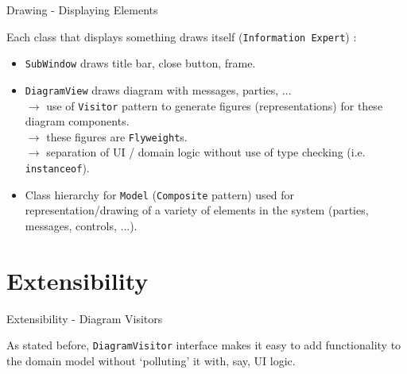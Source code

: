 \documentclass[10pt]{beamer}
\begin{document}
\begin{frame}[fragile]{Drawing - Displaying Elements}
	\begin{center}
	Each class that displays something draws itself (\texttt{Information Expert}) :
	\begin{itemize}
	\item \texttt{SubWindow} draws title bar, close button, frame.
	\item \texttt{DiagramView} draws diagram with messages, parties, ...
	\\$\rightarrow$ use of \texttt{Visitor} pattern to generate figures (representations) for these diagram components.
	\\$\rightarrow$ these figures are \texttt{Flyweight}s.
	\\$\rightarrow$ separation of UI / domain logic without use of type checking (i.e. \texttt{instanceof}).
	\item Class hierarchy for \texttt{Model} (\texttt{Composite} pattern) used for representation/drawing of a variety of elements in the system (parties, messages, controls, ...).
	\end{itemize}
	\end{center}
\end{frame}

\section{Extensibility}

\begin{frame}[fragile]{Extensibility - Diagram Visitors}
	\begin{center}
		As stated before, \texttt{DiagramVisitor} interface makes it easy to add functionality to the domain model without `polluting' it with, say, UI logic.
	\end{center}
\end{frame}
\end{document}
